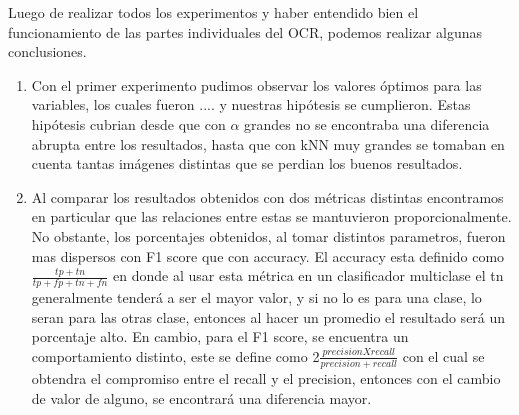 Luego de realizar todos los experimentos y haber entendido bien el funcionamiento de las partes individuales del OCR, podemos realizar algunas conclusiones.

\begin{enumerate}
	\item Con el primer experimento pudimos observar los valores óptimos para las variables, los cuales fueron .... y nuestras hipótesis se cumplieron. Estas hipótesis cubrian desde que con $\alpha$ grandes no se encontraba una diferencia abrupta entre los resultados, hasta que con kNN muy grandes se tomaban en cuenta tantas imágenes distintas que se perdian los buenos resultados.
	\item Al comparar los resultados obtenidos con dos métricas distintas encontramos en particular que las relaciones entre estas se mantuvieron proporcionalmente. No obstante, los porcentajes obtenidos, al tomar distintos parametros, fueron mas dispersos con F1 score que con accuracy. El accuracy esta definido como $\frac{tp + tn}{tp + fp + tn + fn}$ en donde al usar esta métrica en un clasificador multiclase el tn generalmente tenderá a ser el mayor valor, y si no lo es para una clase, lo seran para las otras clase, entonces al hacer un promedio el resultado será un porcentaje alto. En cambio, para el F1 score, se encuentra un comportamiento distinto, este se define como 2$\frac{precisionXrecall}{precision + recall}$ con el cual se obtendra el compromiso entre el recall y el precision, entonces con el cambio de valor de alguno, se encontrará una diferencia mayor.
	

\end{enumerate}